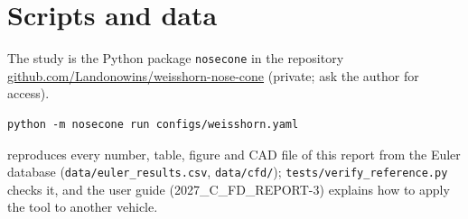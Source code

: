 \section{Scripts and data}
\label{app:scripts}

{\sloppy The study is the Python package \texttt{nosecone} in the repository
\url{github.com/Landonowins/weisshorn-nose-cone} (private; ask the author for access).\par}
\begin{verbatim}
python -m nosecone run configs/weisshorn.yaml
\end{verbatim}
reproduces every number, table, figure and CAD file of this report from the Euler database
(\texttt{data/euler\_results.csv}, \texttt{data/cfd/}); \texttt{tests/verify\_reference.py} checks it, and
the user guide (2027\_C\_FD\_REPORT-3) explains how to apply the tool to another vehicle.
